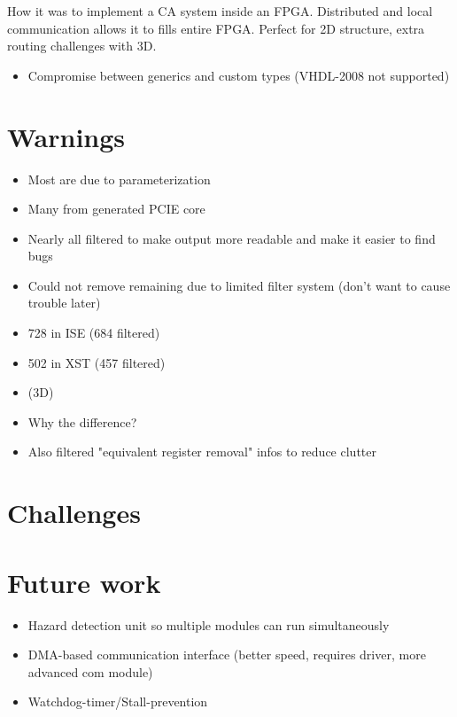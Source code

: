 \TODO
How it was to implement a CA system inside an FPGA.
Distributed and local communication allows it to fills entire FPGA.
Perfect for 2D structure, extra routing challenges with 3D.

\begin{itemize}
    \item Compromise between generics and custom types (VHDL-2008 not supported)
\end{itemize}

\section{Warnings}

\begin{itemize}
    \item Most are due to parameterization
    \item Many from generated PCIE core
    \item Nearly all filtered to make output more readable and make it easier to find bugs
    \item Could not remove remaining due to limited filter system (don't want to cause trouble later)
    \item 728 in ISE (684 filtered)
    \item 502 in XST (457 filtered)
    \item (3D)
    \item Why the difference?
    \item Also filtered "equivalent register removal" infos to reduce clutter
\end{itemize}

\section{Challenges}
\label{sec:challenges}

\TODO

\section{Future work}

\begin{itemize}
    \item Hazard detection unit so multiple modules can run simultaneously
    \item DMA-based communication interface (better speed, requires driver, more advanced com module)
    \item Watchdog-timer/Stall-prevention
\end{itemize}
